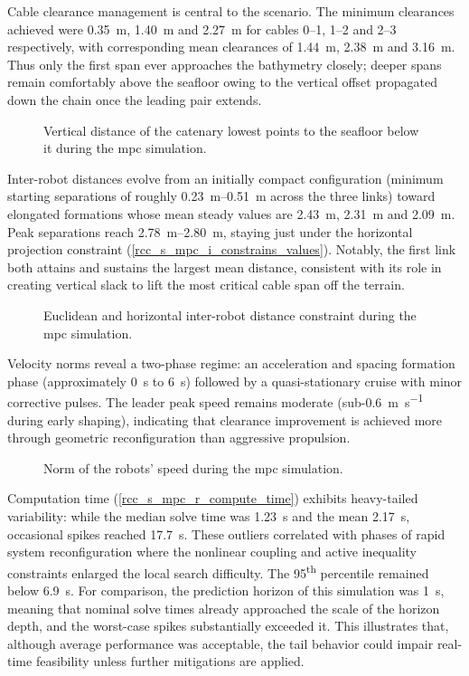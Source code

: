 Cable clearance management is central to the scenario. The minimum clearances achieved were
\qty{0.35}{\m}, \qty{1.40}{\m} and \qty{2.27}{\m} for cables 0--1, 1--2 and 2--3 respectively, with
corresponding mean clearances of \qty{1.44}{\m}, \qty{2.38}{\m} and \qty{3.16}{\m}. Thus only the
first span ever approaches the bathymetry closely; deeper spans remain comfortably above the
seafloor owing to the vertical offset propagated down the chain once the leading pair extends.
\begin{figure}
	\centering
	\caption{Vertical distance of the catenary lowest points to the seafloor below it during the \ac{mpc} simulation.}
	\label{rcc_s_mpc_r_lowest_point}
\end{figure}

Inter-robot distances evolve from an initially compact configuration (minimum starting separations
of roughly \qtyrange{0.23}{0.51}{\m} across the three links) toward elongated formations whose mean
steady values are \qty{2.43}{\m}, \qty{2.31}{\m} and \qty{2.09}{\m}. Peak separations reach
\qtyrange{2.78}{2.80}{\m}, staying just under the horizontal projection constraint
(\cref{rcc_s_mpc_i_constrains_values}). Notably, the first link both attains and sustains the
largest mean distance, consistent with its role in creating vertical slack to lift the most
critical cable span off the terrain.
\begin{figure}
	\centering
	\caption{Euclidean and horizontal inter-robot distance constraint during the \ac{mpc} simulation.}
	\label{rcc_s_mpc_r_inter_robot_distance}
\end{figure}

Velocity norms reveal a two-phase regime: an acceleration and spacing formation phase
(approximately \qty{0}{\s} to \qty{6}{\s}) followed by a quasi-stationary cruise with minor
corrective pulses. The leader peak speed remains moderate (sub-\qty{0.6}{\m\per\s} during early
shaping), indicating that clearance improvement is achieved more through geometric reconfiguration
than aggressive propulsion.
\begin{figure}
	\centering
	\caption{Norm of the robots' speed during the \ac{mpc} simulation.}
	\label{rcc_s_mpc_r_robots_speed}
\end{figure}

Computation time (\cref{rcc_s_mpc_r_compute_time}) exhibits heavy-tailed variability: while the
median solve time was \qty{1.23}{\s} and the mean \qty{2.17}{\s}, occasional spikes reached
\qty{17.7}{\s}. These outliers correlated with phases of rapid system reconfiguration where the
nonlinear coupling and active inequality constraints enlarged the local search difficulty. The
95\textsuperscript{th} percentile remained below \qty{6.9}{\s}. For comparison, the prediction
horizon of this simulation was \qty{1}{\s}, meaning that nominal solve times already approached the
scale of the horizon depth, and the worst-case spikes substantially exceeded it. This illustrates
that, although average performance was acceptable, the tail behavior could impair real-time
feasibility unless further mitigations are applied.

